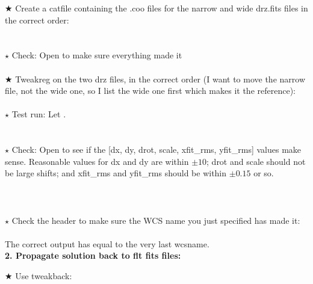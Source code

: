 \documentclass[11pt,obeyspaces]{article} %
\begin{document}
\begin{shaded}
$\bigstar$ Create a catfile containing the .coo files for the narrow and wide drz.fits files in the correct order:\\
\textcolor{red}{} \textcolor{red}{} \textcolor{red}{} \textcolor{red}{}  \textcolor{red}{} \\ \\
$\star$ Check: Open \textcolor{red}{} to make sure everything made it  \\ \\
$\bigstar$ Tweakreg on the two drz files, in the correct order (I want to move the narrow file, not the wide one, so I list the wide one first which makes it the reference):\\ \\
$\star$ Test run: Let . \\
\\ \\
$\star$ Check: Open  to see if the [dx, dy, drot, scale, xfit\_rms, yfit\_rms] values make sense. Reasonable values for dx and dy are within $\pm 10$; drot and scale should not be large shifts; and xfit\_rms and yfit\_rms should be within $\pm 0.15$ or so. \\ \\
 \\ \\
$\star$ Check the header to make sure the WCS name you just specified has made it: \\
 \\
The correct output has  equal to the very last wcsname. \\ 

{\bf 2. Propagate solution back to flt fits files:}

$\bigstar$ Use tweakback: \\
\textcolor{red}{}\textcolor{red}{}


\end{shaded}
\end{document}
